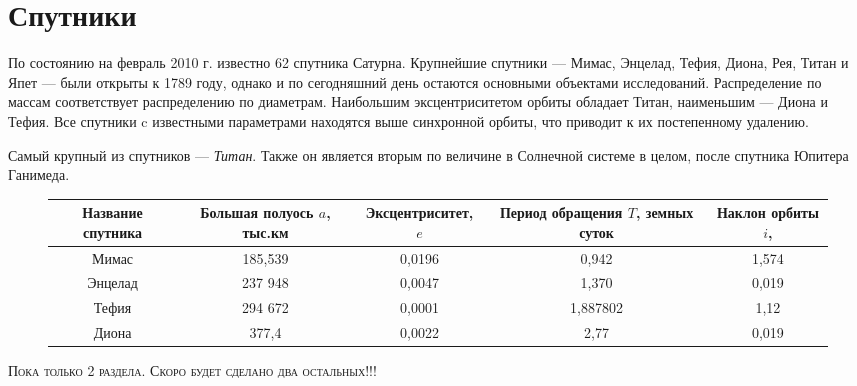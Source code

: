 \documentclass[11pt,a4paper]{article}
\begin{document}
	 \section{Спутники} 
	По состоянию на февраль 2010 г. известно 62 спутника Сатурна. Крупнейшие спутники --- Мимас, Энцелад, Тефия, Диона, Рея, Титан и Япет --- были открыты к 1789 году, однако и по сегодняшний день остаются основными объектами исследований. Распределение по массам соответствует распределению по диаметрам. Наибольшим эксцентриситетом орбиты обладает Титан, наименьшим — Диона и Тефия. Все спутники c известными параметрами находятся выше синхронной орбиты, что приводит к их постепенному удалению. \par 
	Самый крупный из спутников — \textit{Титан}. Также он является вторым по величине в Солнечной системе в целом, после спутника Юпитера Ганимеда. 
	\begin{figure}[h!]
		\begin{tabularx}{\textwidth}{|C|C|C|C|C|}
			\hline
			Название спутника & Большая полуось $a$, тыс.км & Эксцентриситет, $e$ & Период обращения $T$, земных суток & Наклон орбиты $i$, \degree \\
			\hline
			Мимас & 185,539 & 0,0196 & 0,942 & 1,574 \\
			\hline
			Энцелад & 237 948 & 0,0047 & 1,370 & 0,019 \\
			\hline
			Тефия & 294 672 & 0,0001 & 1,887802 & 1,12 \\
			\hline
			Диона & 377,4  & 0,0022 & 2,77 & 0,019 \\
			\hline
		\end{tabularx}
	\end{figure}
	\par \textsc{\LARGE Пока только 2 раздела. Скоро будет сделано два остальных!!!}
\end{document}
